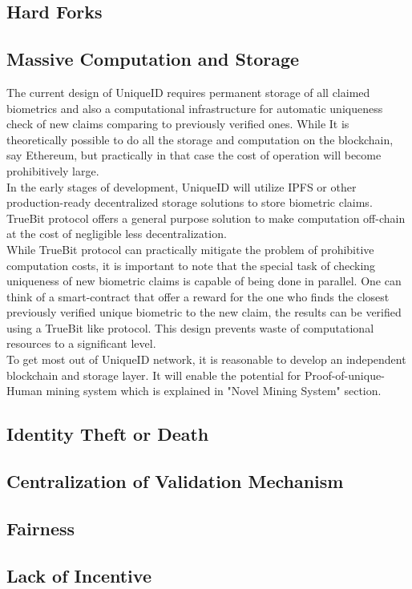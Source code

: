 \documentclass{article}
\begin{document}
\subsection{Hard Forks}
\subsection{Massive Computation and Storage}
The current design of UniqueID requires permanent storage of all claimed biometrics and also a computational infrastructure for automatic uniqueness check of new claims comparing to previously verified ones. While It is theoretically possible to do all the storage and computation on the blockchain, say Ethereum, but practically in that case the cost of operation will become prohibitively large. \\
In the early stages of development, UniqueID will utilize IPFS or other production-ready decentralized storage solutions to store biometric claims. TrueBit protocol offers a general purpose solution to make computation off-chain at the cost of negligible less decentralization. \\
While TrueBit protocol can practically mitigate the problem of prohibitive computation costs, it is important to note that the special task of checking uniqueness of new biometric claims is capable of being done in parallel. One can think of a smart-contract that offer a reward for the one who finds the closest previously verified unique biometric to the new claim, the results can be verified using a TrueBit like protocol. This design prevents waste of computational resources to a significant level.\\
To get most out of UniqueID network, it is reasonable to develop an independent blockchain and storage layer. It will enable the potential for Proof-of-unique-Human mining system which is explained in "Novel Mining System" section. 
\subsection{Identity Theft or Death}
\subsection{Centralization of Validation Mechanism}
\subsection{Fairness}
\subsection{Lack of Incentive}
\end{document}
